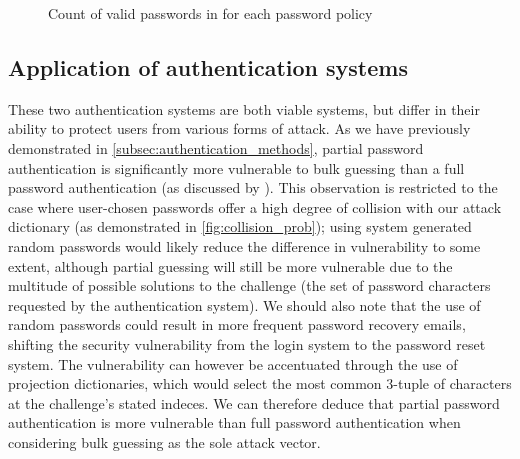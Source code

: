 \documentclass[british,11pt,a4paper]{article}
\begin{document}
\begin{figure}
	\caption{Count of valid passwords in \cite{Cubrilovic2009-wu} for each password policy}
	\label{fig:passwords_length}
\end{figure}


\subsection{Application of authentication systems}
These two authentication systems are both viable systems, but differ in their ability to protect users from various forms of attack. As we have previously demonstrated in \autoref{subsec:authentication_methods}, partial password authentication is significantly more vulnerable to bulk guessing than a full password authentication (as discussed by \citet{Aspinall2013-sh}). This observation is restricted to the case where user-chosen passwords offer a high degree of collision with our attack dictionary (as demonstrated in \autoref{fig:collision_prob}); using system generated random passwords would likely reduce the difference in vulnerability to some extent, although partial guessing will still be more vulnerable due to the multitude of possible solutions to the challenge (the set of password characters requested by the authentication system). We should also note that the use of random passwords could result in more frequent password recovery emails, shifting the security vulnerability from the login system to the password reset system. The vulnerability can however be accentuated through the use of projection dictionaries, which would select the most common 3-tuple of characters at the challenge's stated indeces. We can therefore deduce that partial password authentication is more vulnerable than full password authentication when considering bulk guessing as the sole attack vector.
\end{document}
